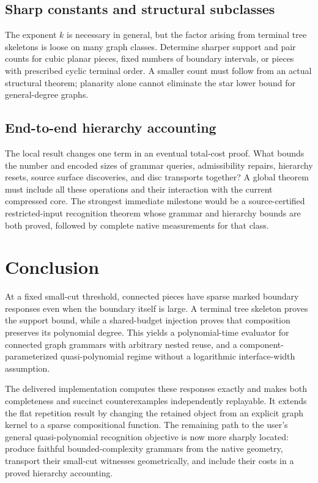 \documentclass[11pt,a4paper]{article}
\theoremstyle{definition}
\theoremstyle{remark}
\begin{document}
\subsection{Sharp constants and structural subclasses}
The exponent $k$ is necessary in general, but the factor arising from terminal tree skeletons is loose on many graph classes. Determine sharper support and pair counts for cubic planar pieces, fixed numbers of boundary intervals, or pieces with prescribed cyclic terminal order. A smaller count must follow from an actual structural theorem; planarity alone cannot eliminate the star lower bound for general-degree graphs.

\subsection{End-to-end hierarchy accounting}
The local result changes one term in an eventual total-cost proof. What bounds the number and encoded sizes of grammar queries, admissibility repairs, hierarchy resets, source surface discoveries, and disc transports together? A global theorem must include all these operations and their interaction with the current compressed core. The strongest immediate milestone would be a source-certified restricted-input recognition theorem whose grammar and hierarchy bounds are both proved, followed by complete native measurements for that class.

\section{Conclusion}
At a fixed small-cut threshold, connected pieces have sparse marked boundary responses even when the boundary itself is large. A terminal tree skeleton proves the support bound, while a shared-budget injection proves that composition preserves its polynomial degree. This yields a polynomial-time evaluator for connected graph grammars with arbitrary nested reuse, and a component-parameterized quasi-polynomial regime without a logarithmic interface-width assumption.

The delivered implementation computes these responses exactly and makes both completeness and succinct counterexamples independently replayable. It extends the flat repetition result by changing the retained object from an explicit graph kernel to a sparse compositional function. The remaining path to the user's general quasi-polynomial recognition objective is now more sharply located: produce faithful bounded-complexity grammars from the native geometry, transport their small-cut witnesses geometrically, and include their costs in a proved hierarchy accounting.
\end{document}
